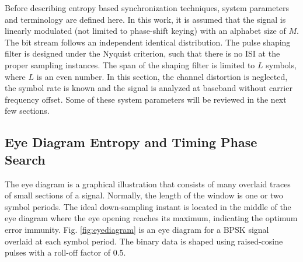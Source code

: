 \documentclass[journal,comsoc]{IEEEtran}
\begin{document}
Before describing entropy based synchronization techniques,
system parameters and terminology are defined here.
In this work, it is assumed that the signal is linearly modulated (not limited to phase-shift keying) with an alphabet size of \(M\).
The bit stream follows an independent identical distribution.
The pulse shaping filter is designed under the Nyquist criterion, such that there is no ISI at the proper sampling instances.
The span of the shaping filter is limited to \(L\) symbols, where \(L\) is an even number.
In this section, the channel distortion is neglected, the symbol rate is known and the signal is analyzed at baseband without carrier frequency offset.
Some of these system parameters will be reviewed in the next few sections.


\subsection{Eye Diagram Entropy and Timing Phase Search}
\label{sec:eye_entropy}
The eye diagram is a graphical illustration that consists of many overlaid traces of small sections of a signal. 
Normally, the length of the window is one or two symbol periods. The ideal down-sampling instant is located in the middle of the eye diagram where the eye opening reaches its maximum, indicating the optimum error immunity.
Fig. \ref{fig:eyediagram} is an eye diagram for a BPSK signal overlaid at each symbol period.
The binary data is shaped using raised-cosine pulses with a roll-off factor of 0.5.
\end{document}
